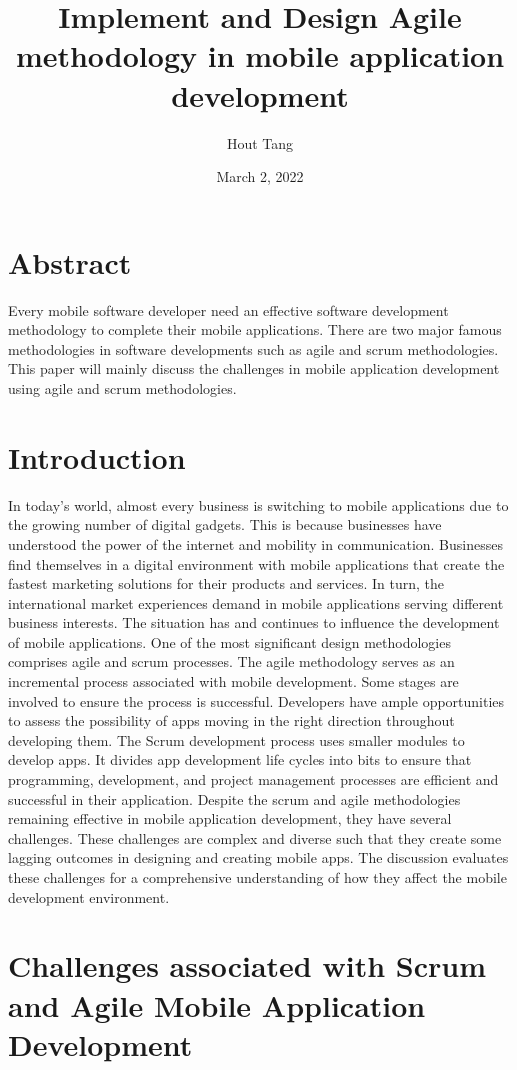 \documentclass{article}
\title{Implement and Design Agile methodology in mobile application development}
\author{Hout Tang}
\date{March 2, 2022}
\begin{document}
\maketitle

\section*{Abstract}
Every mobile software developer need an effective software development methodology to complete their mobile applications. There are two major famous methodologies in software developments such as agile and scrum methodologies. This paper will mainly discuss the challenges in mobile application development using agile and scrum methodologies. 


\section*{Introduction}
 In today’s world, almost every business is switching to mobile applications due to the growing number of digital gadgets. This is because businesses have understood the power of the internet and mobility in communication. Businesses find themselves in a digital environment with mobile applications that create the fastest marketing solutions for their products and services. In turn, the international market experiences demand in mobile applications serving different business interests. The situation has and continues to influence the development of mobile applications. One of the most significant design methodologies comprises agile and scrum processes. The agile methodology serves as an incremental process associated with mobile development. Some stages are involved to ensure the process is successful. Developers have ample opportunities to assess the possibility of apps moving in the right direction throughout developing them. The Scrum development process uses smaller modules to develop apps. It divides app development life cycles into bits to ensure that programming, development, and project management processes are efficient and successful in their application. Despite the scrum and agile methodologies remaining effective in mobile application development, they have several challenges. These challenges are complex and diverse such that they create some lagging outcomes in designing and creating mobile apps. The discussion evaluates these challenges for a comprehensive understanding of how they affect the mobile development environment. 


\section*{Challenges associated with Scrum and Agile Mobile Application Development}
\end{document}
